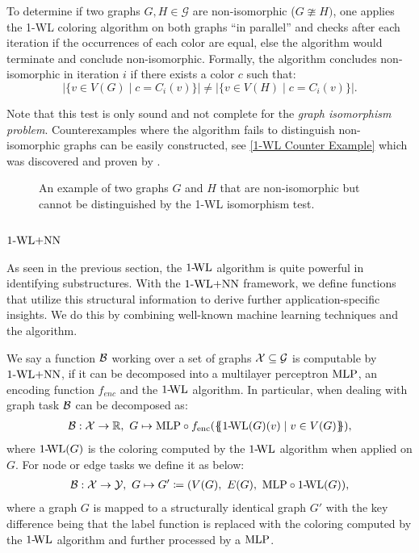 \begin{definition}
    To determine if two graphs $G, H \in \mathcal{G}$ are non-isomorphic ($G \ncong H)$, one applies the 1-WL coloring algorithm on both graphs ``in parallel'' and checks after each iteration if the occurrences of each color are equal, else the algorithm would terminate and conclude non-isomorphic. Formally, the algorithm concludes non-isomorphic in iteration $i$ if there exists a color $c$ such that: 
    \begin{equation*}
        |\{ v \in V(G) \mid c = C_i(v)\} | \neq |\{ v \in V(H) \mid c = C_i(v)\} |.
    \end{equation*}
\end{definition}
Note that this test is only sound and not complete for the \textit{graph isomorphism problem}. Counterexamples where the algorithm fails to distinguish non-isomorphic graphs can be easily constructed, see \autoref{1-WL Counter Example} which was discovered and proven by \cite{Cai1992}.
\begin{figure}[H]
    \centering
    
    \caption{An example of two graphs $G$ and $H$ that are non-isomorphic but cannot be distinguished by the 1-WL isomorphism test.}
    \label{1-WL Counter Example}
\end{figure}

\subsection{$\wlnn$}
As seen in the previous section, the $\text{1-\!WL}$ algorithm is quite powerful in identifying substructures. With the $\wlnn$ framework, we define functions that utilize this structural information to derive further application-specific insights. We do this by combining well-known machine learning techniques and the algorithm.

\begin{definition}[$\wlnn$]
    We say a function $\mathcal{B}$ working over a set of graphs $\mathcal{X} \subseteq \mathcal{G}$ is computable by $\wlnn$, if it can be decomposed into a multilayer perceptron $\text{MLP}$, an encoding function $f_{enc}$ and the $\text{1-\!WL}$ algorithm. In particular, when dealing with graph task $\mathcal{B}$ can be decomposed as:
    \begin{align*}
        \mathcal{B}: \mathcal{X} \rightarrow \mathbb{R}, \ G \mapsto \text{MLP} \circ f_{\text{enc}}(\{\!\!\{ \text{1-\!WL}(G)(v) \mid v \in V(G) \}\!\!\}),
    \end{align*}
    where $\text{1-\!WL}(G)$ is the coloring computed by the $\text{1-\!WL}$ algorithm when applied on $G$. For node or edge tasks we define it as below:
    \begin{align*}
        \mathcal{B}: \mathcal{X} \rightarrow \mathcal{Y}, \ G \mapsto G' \coloneqq (V(G), \ E(G), \ \text{MLP} \circ \text{1-\!WL}(G)),
    \end{align*}
    where a graph $G$ is mapped to a structurally identical graph $G'$ with the key difference being that the label function is replaced with the coloring computed by the $\text{1-\!WL}$ algorithm and further processed by a $\text{MLP}$.
\end{definition}

